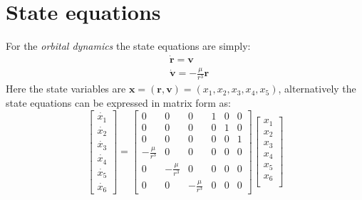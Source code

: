 \section{State equations}
For the \textit{orbital dynamics} the state equations are simply:
\begin{align*}
    &\dot{\mathbf{r}} = \mathbf{v}\\
    &\dot{\mathbf{v}} = -\frac{\mu}{r^3}\mathbf{r}
\end{align*}
Here the state variables are $\mathbf{x}=(\mathbf{r}, \mathbf{v})=(x_1, x_2, x_3, x_4, x_5)$, alternatively the state equations can be expressed in matrix form as: 
\begin{equation*}
    \begin{bmatrix}
        \dot{x_1}\\
        \dot{x_2}\\
        \dot{x_3}\\
        \dot{x_4}\\
        \dot{x_5}\\
        \dot{x_6}
    \end{bmatrix} = \begin{bmatrix}
        0&0&0&1&0&0\\
        0&0&0&0&1&0\\
        0&0&0&0&0&1\\
        -\frac{\mu}{r^3}&0&0&0&0&0\\
        0&-\frac{\mu}{r^3}&0&0&0&0\\
        0&0&-\frac{\mu}{r^3}&0&0&0
    \end{bmatrix}
    \begin{bmatrix}
        x_1\\
        x_2\\
        x_3\\
        x_4\\
        x_5\\
        x_6\\
    \end{bmatrix}
\end{equation*}